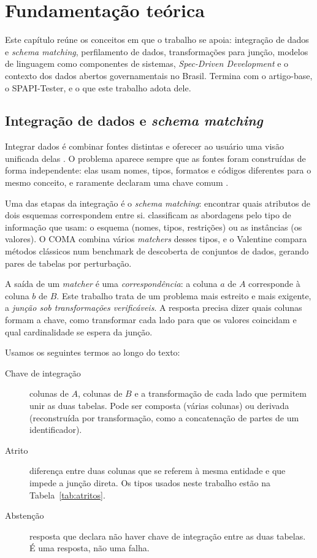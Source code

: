 \chapter{Fundamentação teórica}
\label{chap:fundamentacao}

Este capítulo reúne os conceitos em que o trabalho se apoia: integração de
dados e \emph{schema matching}, perfilamento de dados, transformações para
junção, modelos de linguagem como componentes de sistemas,
\emph{Spec-Driven Development} e o contexto dos dados abertos governamentais
no Brasil. Termina com o artigo-base, o SPAPI-Tester, e o que este trabalho
adota dele.

\section{Integração de dados e \emph{schema matching}}
\label{sec:fundamentacao-integracao-de-dados-e-schema-matching}

Integrar dados é combinar fontes distintas e oferecer ao usuário uma visão
unificada delas \cite{lenzerini2002integration}. O problema aparece sempre que
as fontes foram construídas de forma independente: elas usam nomes, tipos,
formatos e códigos diferentes para o mesmo conceito, e raramente declaram uma
chave comum \cite{doan2012principles}.

Uma das etapas da integração é o \emph{schema matching}: encontrar quais
atributos de dois esquemas correspondem entre si. 
classificam as abordagens pelo tipo de informação que usam: o esquema (nomes,
tipos, restrições) ou as instâncias (os valores). O COMA \cite{do2002coma}
combina vários \emph{matchers} desses tipos, e o Valentine
\cite{koutras2021valentine} compara métodos clássicos num benchmark de
descoberta de conjuntos de dados, gerando pares de tabelas por perturbação.

A saída de um \emph{matcher} é uma \emph{correspondência}: a coluna $a$ de
$A$ corresponde à coluna $b$ de $B$. Este trabalho trata de um problema mais
estreito e mais exigente, a \emph{junção sob transformações verificáveis}. A
resposta precisa dizer quais colunas formam a chave, como transformar cada
lado para que os valores coincidam e qual cardinalidade se espera da junção.

Usamos os seguintes termos ao longo do texto:

\begin{description}
\item[Chave de integração] colunas de $A$, colunas de $B$ e a transformação
de cada lado que permitem unir as duas tabelas. Pode ser composta (várias
colunas) ou derivada (reconstruída por transformação, como a concatenação de
partes de um identificador).
\item[Atrito] diferença entre duas colunas que se referem à mesma entidade e
que impede a junção direta. Os tipos usados neste trabalho estão na
Tabela~\ref{tab:atritos}.
\item[Abstenção] resposta que declara não haver chave de integração entre as
duas tabelas. É uma resposta, não uma falha.
\end{description}

